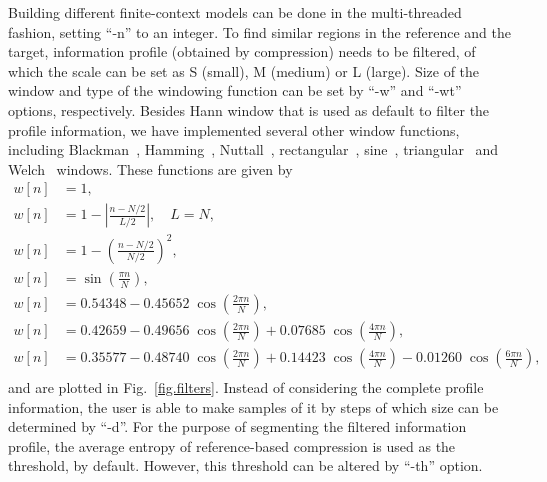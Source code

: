 Building different finite-context models can be done in the multi-threaded fashion, setting ``-n'' to an integer. To find similar regions in the reference and the target, information profile (obtained by compression) needs to be filtered, of which the scale can be set as S (small), M (medium) or L (large). Size of the window and type of the windowing function can be set by ``-w'' and ``-wt'' options, respectively. Besides Hann window that is used as default to filter the profile information, we have implemented several other window functions, including Blackman~\cite{blackman1959particular}, Hamming~\cite{tukey1949measuring}, Nuttall~\cite{nuttall1981some}, rectangular~\cite{oppenheim1999discrete}, sine~\cite{harris1978use}, triangular~\cite{bartlett1950periodogram} and Welch~\cite{welch1967use} windows. These functions are given by
\begin{align}
  w[n] & = 1,
  \tag*{(rectangular)}                                                                                                                                        \\
  w[n] & = 1-\left|\tfrac {n-N/2}{L/2}\right|, \quad L=N,
  \tag*{(triangular/Bartlett)}                                                                                                                                \\
  w[n] & = 1-\left(\tfrac {n-N/2}{N/2}\right)^{2},
  \tag*{(Welch)}                                                                                                                                              \\
  w[n] & = \sin \left(\tfrac {\pi n}{N}\right),
  \tag*{(sine)}                                                                                                                                               \\
  w[n] & = 0.54348-0.45652\;\cos \left(\tfrac {2\pi n}{N}\right),
  \tag*{(Hamming)}                                                                                                                                            \\
  w[n] & = 0.42659-0.49656\;\cos \left(\tfrac {2\pi n}{N}\right)+0.07685\;\cos \left(\tfrac {4\pi n}{N}\right),
  \tag*{(Blackman)}                                                                                                                                           \\
  w[n] & = 0.35577-0.48740\;\cos \left(\tfrac {2\pi n}{N}\right)+0.14423\;\cos \left(\tfrac {4\pi n}{N}\right)-0.01260\;\cos \left(\tfrac {6\pi n}{N}\right),
  \tag*{(Nuttall)}                                                                                                                                            \\
\end{align}
and are plotted in Fig.~\ref{fig.filters}. Instead of considering the complete profile information, the user is able to make samples of it by steps of which size can be determined by ``-d''. For the purpose of segmenting the filtered information profile, the average entropy of reference-based compression is used as the threshold, by default. However, this threshold can be altered by ``-th'' option.

